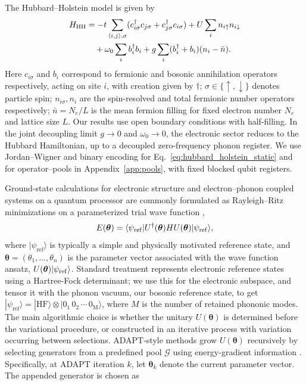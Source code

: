 \documentclass[
  reprint,
  amsmath,
  amssymb,
  aps,
  pra,
  nofootinbib,
  superscriptaddress,
  floatfix
]{revtex4-2}
\newcommand{\ket}[1]{|#1\rangle}
\newcommand{\bra}[1]{\langle #1|}
\begin{document}
The Hubbard--Holstein model is given by
\begin{align}
H_{\rm HH}
&=-t\sum_{\langle i,j\rangle,\sigma}
(c_{i\sigma}^{\dagger}c_{j\sigma}+c_{j\sigma}^{\dagger}c_{i\sigma})
+U\sum_i n_{i\uparrow}n_{i\downarrow}
\nonumber\\
&\quad+\omega_0\sum_i b_i^\dagger b_i
+g\sum_i(b_i^\dagger+b_i)(n_i-\bar n).
\label{eq:hubbard_holstein_static}
\end{align}
Here \(c_{i\sigma}\) and \(b_i\) correspond to fermionic and bosonic annihilation operators respectively, acting on site $i$, with creation given by $\dagger$; $\sigma \in\{\uparrow, \downarrow\}$ denotes particle spin;
\(n_{i\sigma}, n_i\) are the spin-resolved and total fermionic number operators respectively; \(\bar n=N_e/L\) is the mean fermion filling
for fixed electron number \(N_e\) and lattice size \(L\). Our results use open boundary conditions with half-filling.
In the joint decoupling limit $g\to0$ and $\omega_0\to0$, the electronic sector reduces to the Hubbard Hamiltonian, up to a decoupled zero-frequency phonon register. We use Jordan--Wigner and binary encoding for Eq.~\eqref{eq:hubbard_holstein_static} and for operator--pools in Appendix~\ref{app:pools}, with fixed blocked qubit registers.


Ground-state calculations for electronic structure and electron--phonon coupled systems on a quantum processor are commonly formulated as Rayleigh--Ritz minimizations on a parameterized trial wave function \cite{Peruzzo2014,McClean2016,Kandala2017},
\begin{equation}
E(\boldsymbol{\theta})=
\bra{\psi_{\rm ref}}U^\dagger(\boldsymbol{\theta})HU(\boldsymbol{\theta})\ket{\psi_{\rm ref}},
\label{eq:rayleigh_static}
\end{equation}
where \(\ket{\psi_{\mathrm{ref}}}\) is typically a simple and physically motivated reference state, and $\boldsymbol{\theta}=(\theta_1,\ldots,\theta_n)$ is the parameter vector associated with the wave function ansatz, $U(\boldsymbol{\theta})\ket{\psi_{\rm ref}}$. Standard treatment represents electronic reference states using a Hartree-Fock determinant; we use this for the electronic subspace, and tensor it with the phonon vacuum, our bosonic reference state, to get \(\ket{\psi_{\mathrm{ref}}}=\ket{\mathrm{HF}}\otimes\ket{0_1\,0_2\,\cdots\,0_{\mathrm{M}}}\), where \(M\) is the number of retained phononic modes. The main algorithmic choice is whether the unitary \(U(\boldsymbol{\theta})\) is determined before the variational procedure, or constructed in an iterative process with variation occurring between selections. ADAPT-style methods grow \(U(\boldsymbol{\theta})\) recursively by selecting generators from a predefined pool \(\mathcal{G}\) using energy-gradient information \cite{Grimsley2019,Tang2021,Yordanov2021}. Specifically, at ADAPT iteration \(k\), let \(\boldsymbol{\theta}_k\) denote the current parameter vector. The appended generator is chosen as
\end{document}
